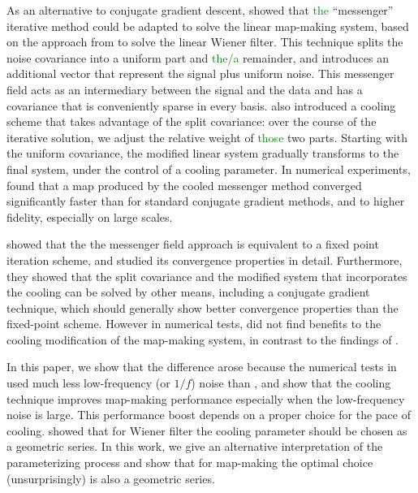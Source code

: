 \documentclass[twocolumn,linenumbers]{aastex631}
\newcommand{\textgreen}[1]{\textcolor{green}{#1}}
\begin{document}
As an alternative to conjugate gradient descent, \citet{Huffenberger_2018} showed that \textgreen{the} ``messenger'' iterative method could be adapted to solve the linear map-making system, based on the  approach from \cite{2013A&A...549A.111E} to solve the linear Wiener filter.
This technique splits the noise covariance into a uniform part and \textgreen{the/a} remainder, and introduces an additional vector that represent the signal plus uniform noise.
This messenger field acts as an intermediary between the signal and the data and has a covariance that is conveniently sparse in every basis.
\cite{2013A&A...549A.111E} also introduced a cooling scheme that takes advantage of the split covariance: over the course of the iterative solution, we adjust the relative weight of \textgreen{those} two parts.  Starting with the uniform covariance, the modified linear system gradually transforms to the final system, under the control of a cooling parameter.  In numerical experiments, \citet{Huffenberger_2018} found that a map produced by the cooled messenger method converged significantly faster than for standard conjugate gradient methods, and to higher fidelity, especially on large scales.  

\citet{2018A&A...620A..59P} showed that the the messenger field approach is equivalent to a fixed point iteration scheme, and studied its convergence properties in detail.  Furthermore, they showed that the split covariance and the modified system that incorporates the cooling can be solved by other means, including a conjugate gradient technique, which should generally show better convergence properties than the fixed-point scheme. However in numerical tests, \citet{2018A&A...620A..59P} did not find benefits to the cooling modification of the map-making system, in contrast to the findings of \citet{Huffenberger_2018}.

In this paper, we show that the difference arose because the numerical tests in \citet{2018A&A...620A..59P} used much less low-frequency (or $1/f$) noise than \citet{Huffenberger_2018}, and show that the cooling technique improves map-making performance especially when the low-frequency noise is large.  This performance boost depends on a proper choice for the pace of cooling.  \citet{2017MNRAS.468.1782K} showed that for Wiener filter the cooling parameter should be chosen as a geometric series.  In this work, we give an alternative interpretation of the parameterizing process and show that for map-making the optimal choice (unsurprisingly) is also a geometric series.
\end{document}
